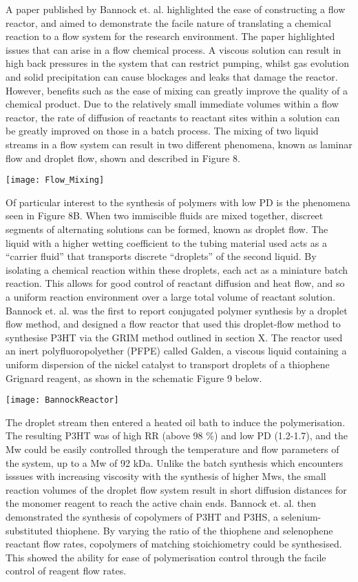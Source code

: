 A paper published by Bannock et. al. highlighted the ease of constructing a flow reactor, and aimed to demonstrate the facile nature of translating a chemical reaction to a flow system for the research environment. The paper highlighted issues that can arise in a flow chemical process. A viscous solution can result in high back pressures in the system that can restrict pumping, whilst gas evolution and solid precipitation can cause blockages and leaks that damage the reactor. However, benefits such as the ease of mixing can greatly improve the quality of a chemical product. Due to the relatively small immediate volumes within a flow reactor, the rate of diffusion of reactants to reactant sites within a solution can be greatly improved on those in a batch process. The mixing of two liquid streams in a flow system can result in two different phenomena, known as laminar flow and droplet flow, shown and described in Figure 8.

\texttt{[image: Flow\_Mixing]}

Of particular interest to the synthesis of polymers with low PD is the phenomena seen in Figure 8B. When two immiscible fluids are mixed together, discreet segments of alternating solutions can be formed, known as droplet flow. The liquid with a higher wetting coefficient to the tubing material used acts as a “carrier fluid” that transports discrete “droplets” of the second liquid. By isolating a chemical reaction within these droplets, each act as a miniature batch reaction. This allows for good control of reactant diffusion and heat flow, and so a uniform reaction environment over a large total volume of reactant solution. Bannock et. al. was the first to report conjugated polymer synthesis by a droplet flow method, and designed a flow reactor that used this droplet-flow method to synthesise P3HT via the GRIM method outlined in section X. The reactor used an inert polyfluoropolyether (PFPE) called Galden, a viscous liquid containing a uniform dispersion of the nickel catalyst to transport droplets of a thiophene Grignard reagent, as shown in the schematic Figure 9 below. 

\texttt{[image: BannockReactor]}

The droplet stream then entered a heated oil bath to induce the polymerisation. The resulting P3HT was of high RR (above 98 \%) and low PD (1.2-1.7), and the Mw could be easily controlled through the temperature and flow parameters of the system, up to a Mw of 92 kDa. Unlike the batch synthesis which encounters isssues with increasing viscosity with the synthesis of higher Mws, the small reaction volumes of the droplet flow system result in short diffusion distances for the monomer reagent to reach the active chain ends. Bannock et. al. then demonstrated the synthesis of copolymers of P3HT and P3HS, a selenium-substituted thiophene. By varying the ratio of the thiophene and selenophene reactant flow rates, copolymers of matching stoichiometry could be synthesised. This showed the ability for ease of polymerisation control through the facile control of reagent flow rates.


